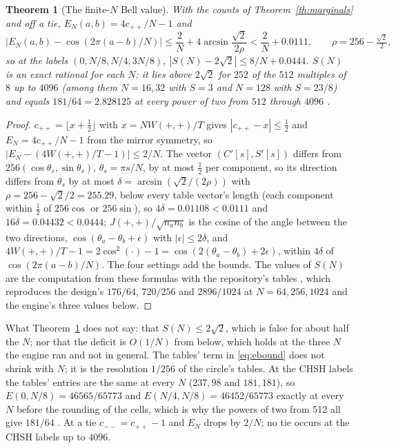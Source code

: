 \documentclass[11pt]{article}
\newtheorem{theorem}{Theorem}
\theoremstyle{definition}
\begin{document}
\begin{theorem}[The finite-$N$ Bell value]\label{th:bell}
With the counts of Theorem~\ref{th:marginals} and off a tie,
$E_N(a, b) = 4c_{++}/N - 1$ and
\begin{equation}
\bigl|E_N(a, b) - \cos(2\pi(a-b)/N)\bigr| \le \frac{2}{N} + 4\arcsin\frac{\sqrt2}{2\rho} < \frac{2}{N} + 0.0111,\qquad \rho = 256 - \tfrac{\sqrt2}{2},
\label{eq:ebound}
\end{equation}
so at the labels $(0, N/8, N/4, 3N/8)$, $|S(N) - 2\sqrt2| \le 8/N + 0.0444$.
$S(N)$ is an exact rational for each $N$; it lies above $2\sqrt2$ for
$252$ of the $512$ multiples of $8$ up to $4096$ (among them $N = 16, 32$
with $S = 3$ and $N = 128$ with $S = 23/8$) and equals $181/64 =
2.828125$ at every power of two from $512$ through $4096$ \cite{checks}.
\end{theorem}
\begin{proof}
$c_{++} = \lfloor x + \tfrac12\rfloor$ with $x = NW(+,+)/T$ gives
$|c_{++} - x| \le \tfrac12$ and $E_N = 4c_{++}/N - 1$ from the mirror
symmetry, so $|E_N - (4W(+,+)/T - 1)| \le 2/N$. The vector
$(C'[s], S'[s])$ differs from $256(\cos\theta_s, \sin\theta_s)$,
$\theta_s = \pi s/N$, by at most $\tfrac12$ per component, so its
direction differs from $\theta_s$ by at most $\delta = \arcsin(\sqrt2/(2\rho))$
with $\rho = 256 - \sqrt2/2 = 255.29$, below every table vector's length
(each component within $\tfrac12$ of $256\cos$ or $256\sin$), so
$4\delta = 0.01108 < 0.0111$ and $16\delta = 0.04432 < 0.0444$;
$J(+,+)/\sqrt{n_a n_b}$ is the cosine of the angle between the two
directions, $\cos(\theta_a - \theta_b + \epsilon)$ with $|\epsilon| \le
2\delta$, and $4W(+,+)/T - 1 = 2\cos^2(\cdot) - 1 = \cos(2(\theta_a -
\theta_b) + 2\epsilon)$, within $4\delta$ of $\cos(2\pi(a-b)/N)$. The
four settings add the bounds. The values of $S(N)$ are the computation
from these formulas with the repository's tables \cite{checks}, which
reproduces the design's $176/64$, $720/256$ and $2896/1024$ at $N = 64,
256, 1024$ and the engine's three values below.
\end{proof}

What Theorem~\ref{th:bell} does not say: that $S(N) \le 2\sqrt2$, which is
false for about half the $N$; nor that the deficit is $O(1/N)$ from below,
which holds at the three $N$ the engine ran and not in general. The
tables' term in \eqref{eq:ebound} does not shrink with $N$; it is the
resolution $1/256$ of the circle's tables. At the CHSH labels the tables'
entries are the same at every $N$ ($237, 98$ and $181, 181$), so
$E(0, N/8) = 46565/65773$ and $E(N/4, N/8) = 46452/65773$ exactly at every
$N$ before the rounding of the cells, which is why the powers of two from
512 all give $181/64$ \cite{checks,register}. At a tie $c_{--} = c_{++} - 1$ and
$E_N$ drops by $2/N$; no tie occurs at the CHSH labels up to $4096$.
\end{document}
